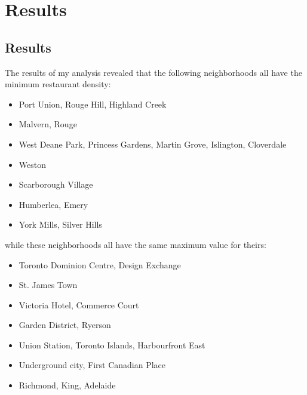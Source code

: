 \documentclass[aspectratio=169]{beamer}
\begin{document}

\section{Results}

\subsection{Results}

\begin{frame}

The results of my analysis revealed that the following neighborhoods all have the minimum restaurant density:

\begin{itemize}
 \item Port Union, Rouge Hill, Highland Creek
 \item Malvern, Rouge
 \item West Deane Park, Princess Gardens, Martin Grove, Islington, Cloverdale
 \item Weston
 \item Scarborough Village
 \item Humberlea, Emery
 \item York Mills, Silver Hills
\end{itemize}

\end{frame}

\begin{frame}

while these neighborhoods all have the same maximum value for theirs:

\begin{itemize}
 \item Toronto Dominion Centre, Design Exchange
 \item St. James Town
 \item Victoria Hotel, Commerce Court
 \item Garden District, Ryerson
 \item Union Station, Toronto Islands, Harbourfront East
 \item Underground city, First Canadian Place
 \item Richmond, King, Adelaide
\end{itemize}

\end{frame}
\end{document}
